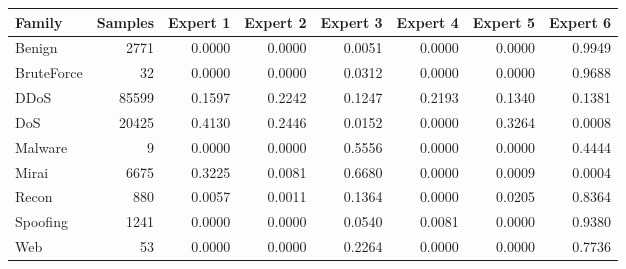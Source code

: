 \begin{tabular}{lrrrrrrr}
\toprule
Family & Samples & Expert 1 & Expert 2 & Expert 3 & Expert 4 & Expert 5 & Expert 6 \\
\midrule
Benign & 2771 & 0.0000 & 0.0000 & 0.0051 & 0.0000 & 0.0000 & 0.9949 \\
BruteForce & 32 & 0.0000 & 0.0000 & 0.0312 & 0.0000 & 0.0000 & 0.9688 \\
DDoS & 85599 & 0.1597 & 0.2242 & 0.1247 & 0.2193 & 0.1340 & 0.1381 \\
DoS & 20425 & 0.4130 & 0.2446 & 0.0152 & 0.0000 & 0.3264 & 0.0008 \\
Malware & 9 & 0.0000 & 0.0000 & 0.5556 & 0.0000 & 0.0000 & 0.4444 \\
Mirai & 6675 & 0.3225 & 0.0081 & 0.6680 & 0.0000 & 0.0009 & 0.0004 \\
Recon & 880 & 0.0057 & 0.0011 & 0.1364 & 0.0000 & 0.0205 & 0.8364 \\
Spoofing & 1241 & 0.0000 & 0.0000 & 0.0540 & 0.0081 & 0.0000 & 0.9380 \\
Web & 53 & 0.0000 & 0.0000 & 0.2264 & 0.0000 & 0.0000 & 0.7736 \\
\bottomrule
\end{tabular}
